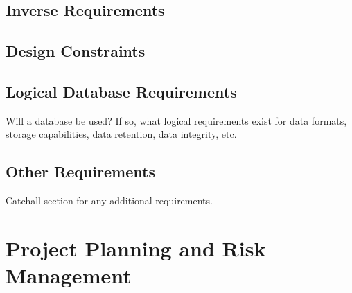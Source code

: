 \documentclass[titlepage]{article}
\begin{document}
\subsection{Inverse Requirements}

\subsection{Design Constraints}


\subsection{Logical Database Requirements}
Will a database be used?  If so, what logical requirements exist for data formats, storage capabilities, data retention, data integrity, etc.

\subsection{Other Requirements}
Catchall section for any additional requirements.

\section{Project Planning and Risk Management}

\def \Ta {\shortstack{Existing \\ Computer Vision \\ Libraries}}
\def \TaAlt {Research Libraries}

\def \Tb {\shortstack{Learn \\ Dependent \\ APIs}}
\def \TbAlt {Learn API}

\def \Tc {\shortstack{Database \\ Design}}
\def \TcAlt {Database Design}

\def \Td {\shortstack{Software \\ Design}}
\def \TdAlt {Software Design}

\def \Te {\shortstack{Database \\ Development}}
\def \TeAlt {Database Dev.}

\def \Tf {\shortstack{Software \\ Development}}
\def \TfAlt {Software Dev.}
\end{document}
